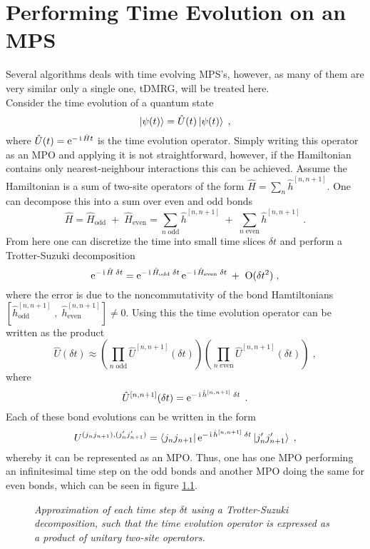 \chapter{Performing Time Evolution on an MPS}
Several algorithms deals with time evolving MPS's, however, as many of them are very similar only a single one, tDMRG, will be treated here.\\
Consider the time evolution of a quantum state
\begin{equation}
	\ket{\psi (t)} = \hat{U}(t) \ket{\psi (t)} \; ,
\end{equation}
where $\hat{U}(t) = \operatorname{e}^{ - \operatorname{i} \hat{H} t }$ is the time evolution operator. Simply writing this operator as an MPO and applying it is not straightforward, however, if the Hamiltonian contains only nearest-neighbour interactions this can be achieved.
Assume the Hamiltonian is a sum of two-site operators of the form $\hat{H} = \sum_{n} \hat{h}^{[n , n+1]}$. One can decompose this into a sum over even and odd bonds
\begin{equation}
	\hat{H} = \hat{H}_{\mathrm{odd}} \; + \; \hat{H}_{\mathrm{even}} = \sum_{n \; \mathrm{odd}} \hat{h}^{[n , n+1]} \; + \; \sum_{n \; \mathrm{even}} \hat{h}^{[n , n+1]} \; .
\end{equation}  
From here one can discretize the time into small time slices $\delta t$ and perform a Trotter-Suzuki decomposition \cite{Suzuki}
\begin{equation}
	\operatorname{e}^{- \operatorname{i} \hat{H} \; \delta t} = \operatorname{e}^{- \operatorname{i} \hat{H}_{\mathrm{odd}} \; \delta t } \operatorname{e}^{- \operatorname{i} \hat{H}_{\mathrm{even}} \; \delta t} \; + \; \;  \mathrm{O}(\delta t^2) \; ,
\end{equation}
where the error is due to the noncommutativity of the bond Hamtiltonians $[ \hat{h}_{\mathrm{odd}}^{[n , n+1]} \; , \; \hat{h}_{\mathrm{even}}^{[n , n+1]} ] \neq 0$. Using this the time evolution operator can be written as the product
\begin{equation}
	\hat{U}(\delta t) \approx \left( \prod_{n \; \mathrm{odd}} \hat{U}^{[n,n+1]} (\delta t) \right) \left( \prod_{n \; \mathrm{even}} \hat{U}^{[n,n+1]} (\delta t) \right) \; ,
\end{equation}
where
\begin{equation}
	\hat{U}^{[n,n+1]} (\delta t) = \operatorname{e}^{- \operatorname{i} \hat{h}^{[n , n+1]} \; \delta t } \; .
\end{equation}
Each of these bond evolutions can be written in the form
\begin{equation}
	 U^{(j_n j_{n+1}), (j_n ' j_{n+1} ')} =  \bra{j_n j_{n+1}} \operatorname{e}^{- \operatorname{i} \hat{h}^{[n , n+1]} \; \delta t } \ket{j_n ' j_{n+1} '} \; ,
\end{equation}
whereby it can be represented as an MPO. Thus, one has one MPO performing an infinitesimal time step on the odd bonds and another MPO doing the same for even bonds, which can be seen in figure \ref{fig:oddevenops}.
\begin{figure}[h!]
	\centering
	
	\caption{\textit{Approximation of each time step $\delta t$ using a Trotter-Suzuki decomposition, such that the time evolution operator is expressed as a product of unitary two-site operators.}}
	\label{fig:oddevenops}
\end{figure}

